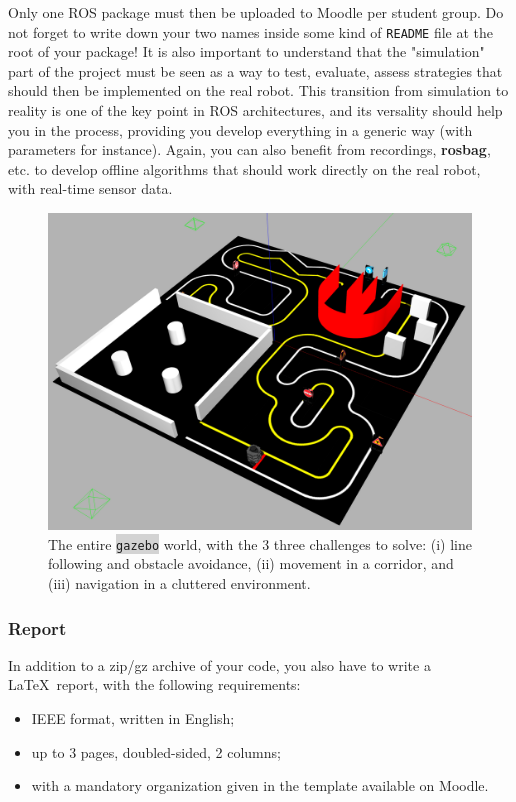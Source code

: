 \documentclass[10pt,a4paper,printanswers]{upmc}
\newcommand{\mytext}[1]{\colorbox{lightgray}{\texttt{#1}}}
\begin{document}
Only one ROS package must then be uploaded to Moodle per student group. Do not forget to write down
your two names inside some kind of \texttt{README} file at the root of your package!
It is also important to understand that the "simulation" part of the project must be seen as a way to
test, evaluate, assess strategies that should then be implemented on the real robot. This transition
from simulation to reality is one of the key point in ROS architectures, and its versality should
help you in the process, providing you develop everything in a generic way (with parameters for
instance). Again, you can also benefit from recordings, \textbf{rosbag}, etc. to develop offline algorithms
that should work directly on the real robot, with real-time sensor data.
%
\begin{figure}[!h]
  \centering
  \includegraphics[width=12cm]{figures/world_autorace.png}
  \caption{The entire \mytext{gazebo} world, with the 3 three challenges to
    solve: (i) line following and obstacle avoidance, (ii) movement in a corridor, and (iii)
    navigation in a cluttered environment.}
  \label{fig:gazebo_world}
\end{figure}

\subsubsection{Report}
In addition to a zip/gz archive of your code, you also have to write a \LaTeX~report, with the
following requirements:
\begin{itemize}
  \itemsep=-1pt
  \item IEEE format, written in English;
  \item up to 3 pages, doubled-sided, 2 columns;
  \item with a mandatory organization given in the template available on Moodle.
\end{itemize}
\end{document}
